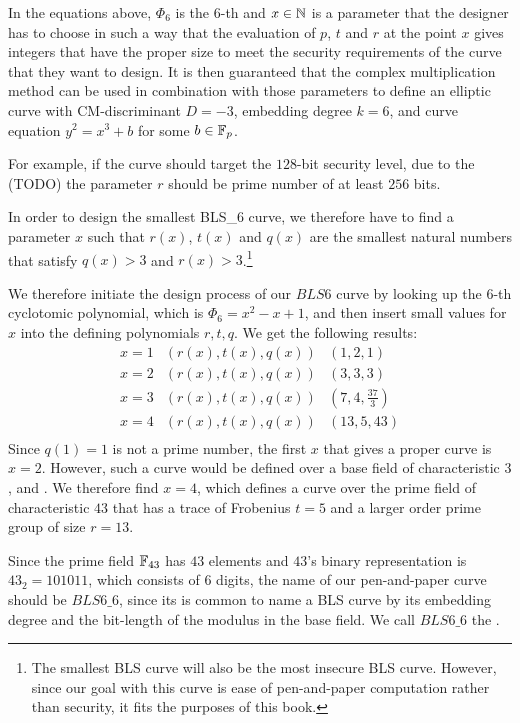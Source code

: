 In the equations above, $\Phi_6$ is the $6$-th  and  $x\in\mathbb{N}$ is a parameter that the designer has to choose in such a way that the evaluation of $p$, $t$ and $r$ at the point $x$ gives integers that have the proper size to meet the security requirements of the curve that they want to design. It is then guaranteed that the complex multiplication method can be used in combination with those parameters to define an elliptic curve with CM-discriminant $D=-3$, embedding degree $k=6$, and curve equation $y^2 = x^3 +b$ for some $b\in\mathbb{F}_p$. 

For example, if the curve should target the $128$-bit security level, due to the  (TODO) the parameter $r$ should be prime number of at least $256$ bits.

In order to design the smallest BLS\_6 curve, we therefore have to find a parameter $x$ such that $r(x)$, $t(x)$ and $q(x)$ are the smallest natural numbers that satisfy $q(x)>3$ and $r(x)>3$.\footnote{The smallest BLS curve will also be the most insecure BLS curve. However, since our goal with this curve is ease of pen-and-paper computation rather than security, it fits the purposes of this book.}

We therefore initiate the design process of our $BLS6$ curve by looking up the $6$-th cyclotomic polynomial, which is $\Phi_{6}=x^2-x+1$, and then insert small values for $x$ into the defining polynomials $r,t,q$. We get the following results:
$$
\begin{array}{lcr}
x=1 & (r(x),t(x),q(x)) & (1,2,1)\\
x=2 & (r(x),t(x),q(x)) & (3,3,3)\\
x=3 & (r(x),t(x),q(x)) & (7,4,\frac{37}{3})\\
x=4 & (r(x),t(x),q(x)) & (13,5,43)\\
\end{array}
$$
Since $q(1)=1$ is not a prime number, the first $x$ that gives a proper curve is $x=2$. However, such a curve would be defined over a base field of characteristic $3$, and . We therefore find $x=4$, which defines a curve over the prime field of characteristic $43$ that has a trace of Frobenius $t=5$ and a larger order prime group of size $r=13$. 

Since the prime field $\mathbb{F}_{43}$ has $43$ elements and $43$'s binary representation is $43_2= 101011$, which consists of $6$ digits, the name of our pen-and-paper curve should be $BLS6\_6$, since its is common to name a BLS curve by its embedding degree and the bit-length of the modulus in the base field. We call $BLS6\_6$ the .

